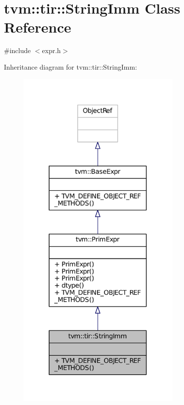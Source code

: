 \hypertarget{classtvm_1_1tir_1_1StringImm}{}\section{tvm\+:\+:tir\+:\+:String\+Imm Class Reference}
\label{classtvm_1_1tir_1_1StringImm}


{\ttfamily \#include $<$expr.\+h$>$}



Inheritance diagram for tvm\+:\+:tir\+:\+:String\+Imm\+:
\nopagebreak
\begin{figure}[H]
\begin{center}
\leavevmode
\includegraphics[width=230pt]{classtvm_1_1tir_1_1StringImm__inherit__graph}
\end{center}
\end{figure}


